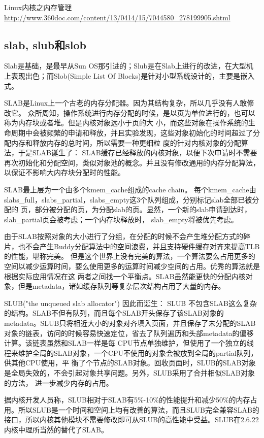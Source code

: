 Linux内核之内存管理
\url{http://www.360doc.com/content/13/0414/15/7044580_278199905.shtml}

\subsection{slab, slub和slob}

Slab是基础，是最早从Sun OS那引进的；Slub是在Slab上进行的改进，在大型机上表现出色；而Slob(Simple List Of Blocks)是针对小型系统设计的，主要是嵌入式。


SLAB是Linux上一个古老的内存分配器。因为其结构复杂，所以几乎没有人敢修改它。
众所周知，操作系统进行内存分配的时候，是以页为单位进行的，也可以称为内存块或者堆。但是内核对象远小于页的大 小，而这些对象在操作系统的生命周期中会被频繁的申请和释放，并且实验发现，这些对象初始化的时间超过了分配内存和释放内存的总时间，所以需要一种更细粒 度的针对内核对象的分配算法，于是SLAB诞生了：
SLAB缓存已经释放的内核对象，以便下次申请时不需要再次初始化和分配空间，类似对象池的概念。并且没有修改通用的内存分配算法，以保证不影响大内存块分配时的性能。

SLAB最上层为一个由多个kmem\_cache组成的cache chain。
每个kmem\_cache由slabs\_full，slabs\_partial，slabs\_empty这3个队列组成，分别标记slab全部已被分配的 页，部分被分配的页，为分配slab的页。显然，一个新的slab申请到达时，slab\_partial页会被考虑；一个内存块释放时， slab\_empty将被优先考虑。

由于SLAB按照对象的大小进行了分组，在分配的时候不会产生堆分配方式的碎片，也不会产生Buddy分配算法中的空间浪费，并且支持硬件缓存对齐来提高TLB的性能，堪称完美。
但是这个世界上没有完美的算法，一个算法要么占用更多的空间以减少运算时间，要么使用更多的运算时间减少空间的占用。优秀的算法就是根据实际应用情况在这 两者之间找一个平衡点。SLAB虽然能更快的分配内核对象，但是metadata，诸如缓存队列等复杂层次结构占用了大量的内存。

SLUB("the unqueued slab allocator") 因此而诞生：
SLUB 不包含SLAB这么复杂的结构。SLAB不但有队列，而且每个SLAB开头保存了该SLAB对象的metadata。SLUB只将相近大小的对象对齐填入页面，并且保存了未分配的SLAB对象的链表，访问的时候容易快速定位，省去了队列遍历和头部metadata的偏移计算。该链表虽然和SLAB一样是每 CPU节点单独维护，但使用了一个独立的线程来维护全局的SLAB对象，一个CPU不使用的对象会被放到全局的partial队列，供其他CPU使用，平 衡了个节点的SLAB对象。回收页面时，SLUB的SLAB对象是全局失效的，不会引起对象共享问题。另外，SLUB采用了合并相似SLAB对象的方法， 进一步减少内存的占用。

据内核开发人员称，SLUB相对于SLAB有5\%-10\%的性能提升和减少50\%的内存占用。所以SLUB是一个时间和空间上均有改善的算法，而且SLUB完全兼容SLAB的接口，所以内核其他模块不需要修改即可从SLUB的高性能中受益。SLUB在2.6.22内核中理所当然的替代了SLAB。

